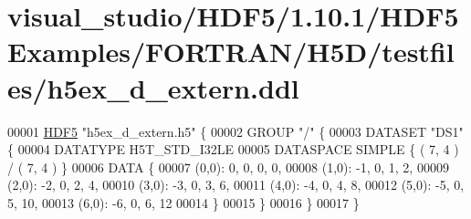\hypertarget{visual__studio_2_h_d_f5_21_810_81_2_h_d_f5_examples_2_f_o_r_t_r_a_n_2_h5_d_2testfiles_2h5ex__d__extern_8ddl_source}{}\section{visual\+\_\+studio/\+H\+D\+F5/1.10.1/\+H\+D\+F5\+Examples/\+F\+O\+R\+T\+R\+A\+N/\+H5\+D/testfiles/h5ex\+\_\+d\+\_\+extern.ddl}
\label{visual__studio_2_h_d_f5_21_810_81_2_h_d_f5_examples_2_f_o_r_t_r_a_n_2_h5_d_2testfiles_2h5ex__d__extern_8ddl_source}

\begin{DoxyCode}
00001 \hyperlink{namespace_h_d_f5}{HDF5} \textcolor{stringliteral}{"h5ex\_d\_extern.h5"} \{
00002 GROUP \textcolor{stringliteral}{"/"} \{
00003    DATASET \textcolor{stringliteral}{"DS1"} \{
00004       DATATYPE  H5T\_STD\_I32LE
00005       DATASPACE  SIMPLE \{ ( 7, 4 ) / ( 7, 4 ) \}
00006       DATA \{
00007       (0,0): 0, 0, 0, 0,
00008       (1,0): -1, 0, 1, 2,
00009       (2,0): -2, 0, 2, 4,
00010       (3,0): -3, 0, 3, 6,
00011       (4,0): -4, 0, 4, 8,
00012       (5,0): -5, 0, 5, 10,
00013       (6,0): -6, 0, 6, 12
00014       \}
00015    \}
00016 \}
00017 \}
\end{DoxyCode}
